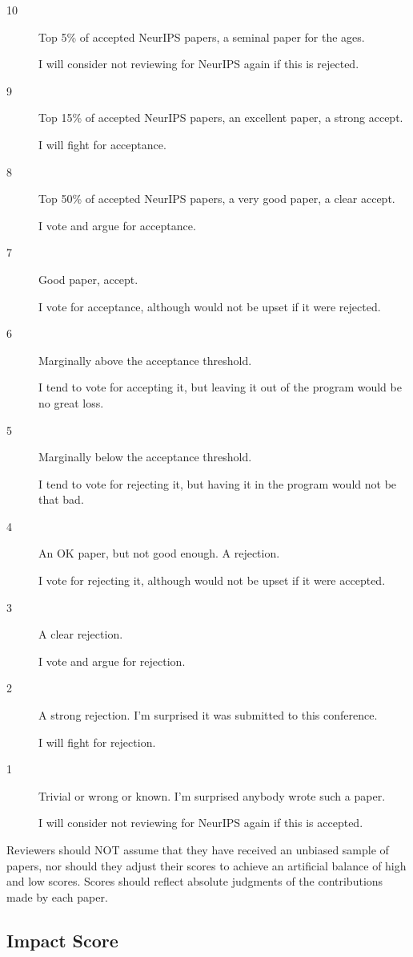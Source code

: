 \begin{description}
\item[10] Top 5\% of accepted NeurIPS papers, a seminal paper for the ages.

  I will consider not reviewing for NeurIPS again if this is rejected.
\item[9] Top 15\% of accepted NeurIPS papers, an excellent paper, a strong
  accept.

  I will fight for acceptance.
\item[8] Top 50\% of accepted NeurIPS papers, a very good paper, a clear
  accept.

  I vote and argue for acceptance.
\item[7] Good paper, accept.

  I vote for acceptance, although would not be upset if it were
  rejected.
\item[6] Marginally above the acceptance threshold.

  I tend to vote for accepting it, but leaving it out of the program
  would be no great loss.
\item[5] Marginally below the acceptance threshold.

  I tend to vote for rejecting it, but having it in the program would
  not be that bad.
\item[4] An OK paper, but not good enough. A rejection.

  I vote for rejecting it, although would not be upset if it were
  accepted.
\item[3] A clear rejection.

  I vote and argue for rejection.
\item[2] A strong rejection. I'm surprised it was submitted to this
  conference.

  I will fight for rejection.
\item[1] Trivial or wrong or known. I'm surprised anybody wrote such a
  paper.

  I will consider not reviewing for NeurIPS again if this is accepted.
\end{description}

Reviewers should NOT assume that they have received an unbiased sample
of papers, nor should they adjust their scores to achieve an artificial
balance of high and low scores. Scores should reflect absolute judgments
of the contributions made by each paper.

\subsection*{Impact Score}\label{impact-score}


